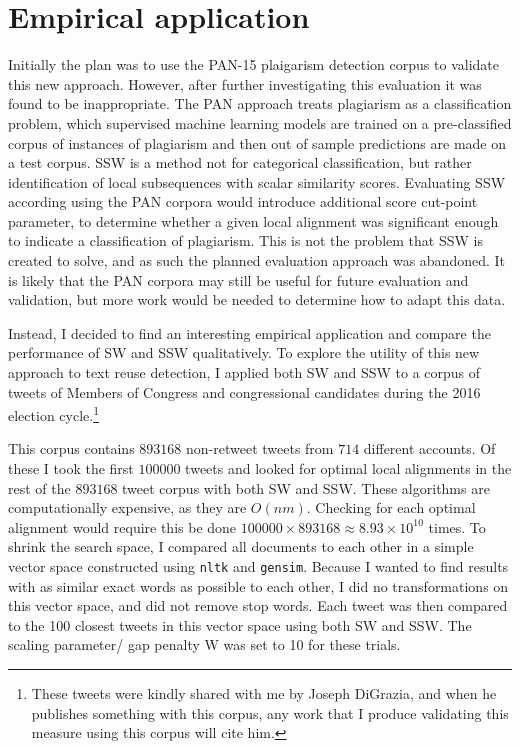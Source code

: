 {\section{Empirical application}
Initially the plan was to use the PAN-15 plaigarism detection corpus to validate this new approach\cite{potthast2010evaluation}. However, after further investigating this evaluation it was found to be inappropriate. The PAN approach treats plagiarism as a classification problem, which supervised machine learning models are trained on a pre-classified corpus of instances of plagiarism and then out of sample predictions are made on a test corpus. SSW is a method not for categorical classification, but rather identification of local subsequences with scalar similarity scores. Evaluating SSW according using the PAN corpora would introduce additional score cut-point parameter, to determine whether a given local alignment was significant enough to indicate a classification of plagiarism. This is not the problem that SSW is created to solve, and as such the planned evaluation approach was abandoned. It is likely that the PAN corpora may still be useful for future evaluation and validation, but more work would be needed to determine how to adapt this data.

Instead, I decided to find an interesting empirical application and compare the performance of SW and SSW qualitatively. To explore the utility of this new approach to text reuse detection, I applied both SW and SSW to a corpus of tweets of Members of Congress and congressional candidates during the 2016 election cycle.\footnote{These tweets were kindly shared with me by Joseph DiGrazia, and when he publishes something with this corpus, any work that I produce validating this measure using this corpus will cite him.}

This corpus contains $893168$ non-retweet tweets from $714$ different accounts. Of these I took the first $100000$ tweets and looked for optimal local alignments in the rest of the $893168$ tweet corpus with both SW and SSW. These algorithms are computationally expensive, as they are $O(nm)$. Checking for each optimal alignment would require this be done $100000 \times 893168 \approx 8.93 \times 10^{10}$ times. To shrink the search space, I compared all documents to each other in a simple vector space constructed using \texttt{nltk} and \texttt{gensim}. Because I wanted to find results with as similar exact words as possible to each other, I did no transformations on this vector space, and did not remove stop words. Each tweet was then compared to the 100 closest tweets in this vector space using both SW and SSW. The scaling parameter/ gap penalty W was set to 10 for these trials.

}

